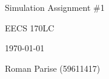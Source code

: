 \centering
\vspace{2.5cm}
{\huge Simulation Assignment \#1 \par}
{\Large EECS 170LC \par}
{\Large \today \par}
\vspace{1cm}
{\large Roman Parise (59611417) \par}
\vspace{1cm}
